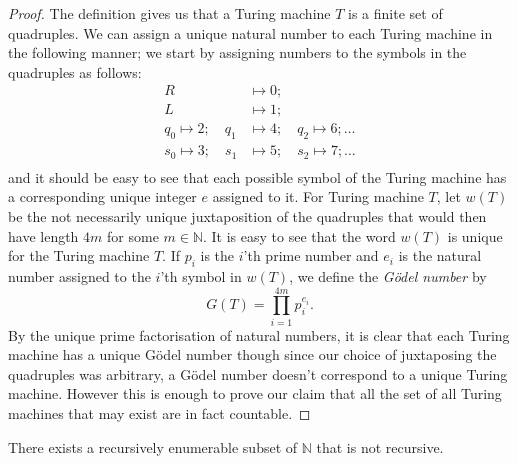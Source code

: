 \begin{proof}
  The definition gives us that a Turing machine $T$ is a finite set of quadruples. We can assign a unique natural number to each Turing machine in the following manner; we start by assigning numbers to the symbols in the quadruples as follows:
  \begin{align*}
    R &\mapsto 0; \\
    L &\mapsto 1; \\
    q_0 \mapsto 2; \quad q_1 &\mapsto 4; \quad q_2 \mapsto 6; \dots \\
    s_0 \mapsto 3; \quad s_1 &\mapsto 5; \quad s_2 \mapsto 7; \dots \\
  \end{align*}
  and it should be easy to see that each possible symbol of the Turing machine has a corresponding unique integer $e$ assigned to it. For Turing machine $T$, let $w(T)$ be the not necessarily unique juxtaposition of the quadruples that would then have length $4m$ for some $m \in \mathbb{N}$. It is easy to see that the word $w(T)$ is unique for the Turing machine $T$. If $p_i$ is the $i$'th prime number and $e_i$ is the natural number assigned to the $i$'th symbol in $w(T)$, we define the \emph{G\"odel number} by
  \begin{equation*}
    G(T) = \prod_{i=1}^{4m} p_i^{e_i}.
  \end{equation*}
  By the unique prime factorisation of natural numbers, it is clear that each Turing machine has a unique G\"odel number though since our choice of juxtaposing the quadruples was arbitrary, a G\"odel number doesn't correspond to a unique Turing machine. However this is enough to prove our claim that all the set of all Turing machines that may exist are in fact countable.
\end{proof}

\begin{theorem}
  \label{thm:natural}
  There exists a recursively enumerable subset of $\mathbb{N}$ that is not recursive.
\end{theorem}

